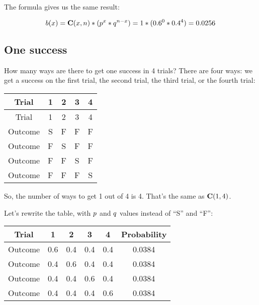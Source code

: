 \documentclass[../../../main.tex]{subfiles}
\begin{document}
\noindent
The formula gives us the same result:

\begin{equation*}
  \Binom{\RandVarVal/} = \combs{\RandVarVal/}{n} * (p^{\RandVarVal/} * q^{n - \RandVarVal/}) = 1 * (0.6^{0} * 0.4^{4}) = 0.0256
\end{equation*}


\subsection{One success}

How many ways are there to get one success in 4 trials? There are four ways: we get a success on the first trial, the second trial, the third trial, or the fourth trial:

\begin{center}
  \begin{tabular}{| c | c | c | c | c |}
    \hline
    \textbf{Trial} & \textbf{1} & \textbf{2} & \textbf{3} & \textbf{4} \\ \hline
    Trial & 1 & 2 & 3 & 4 \\ \hline
  Outcome & S & F & F & F \\ \hline
  Outcome & F & S & F & F \\ \hline
  Outcome & F & F & S & F \\ \hline
  Outcome & F & F & F & S \\ \hline
  \end{tabular}
\end{center}

\noindent
So, the number of ways to get 1 out of 4 is 4. That's the same as $\mathbf{C}(1, 4)$. 

Let's rewrite the table, with $\success/$ and $\failure/$ values instead of ``S'' and ``F'':

\begin{center}
  \begin{tabular}{| c | c | c | c | c | c |}
    \hline
    \textbf{Trial} & \textbf{1} & \textbf{2} & \textbf{3} & \textbf{4} & \textbf{Probability} \\ \hline
  Outcome & 0.6 & 0.4 & 0.4 & 0.4 & 0.0384 \\ \hline
  Outcome & 0.4 & 0.6 & 0.4 & 0.4 & 0.0384 \\ \hline
  Outcome & 0.4 & 0.4 & 0.6 & 0.4 & 0.0384 \\ \hline
  Outcome & 0.4 & 0.4 & 0.4 & 0.6 & 0.0384 \\ \hline
  \end{tabular}
\end{center}
\end{document}
